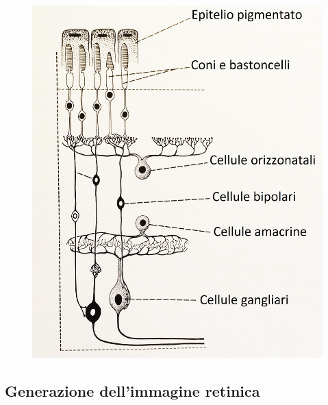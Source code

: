\begin{figure}[h!]
\begin{minipage}{.5\textwidth}
  \includegraphics[scale=0.08]{source/immagini/retina.jpg}
  \label{fig:test2}
\end{minipage}
\end{figure}


\subsection{Generazione dell'immagine retinica}

